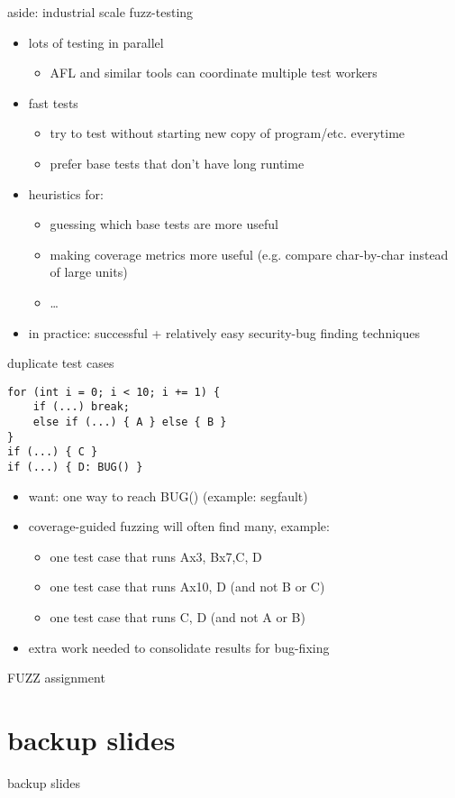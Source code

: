 \begin{frame}{aside: industrial scale fuzz-testing}
    \begin{itemize}
    \item lots of testing in parallel
        \begin{itemize}
        \item AFL and similar tools can coordinate multiple test workers
        \end{itemize}
    \item fast tests
        \begin{itemize}
        \item try to test without starting new copy of program/etc. everytime
        \item prefer base tests that don't have long runtime
        \end{itemize}
    \item heuristics for:   
        \begin{itemize}
        \item guessing which base tests are more useful
        \item making coverage metrics more useful (e.g. compare char-by-char instead of large units)
        \item \ldots
        \end{itemize}
    \item in practice: successful + relatively easy security-bug finding techniques
    \end{itemize}
\end{frame}

\begin{frame}[fragile]{duplicate test cases}
\begin{Verbatim}[fontsize=\small]
for (int i = 0; i < 10; i += 1) {
    if (...) break;
    else if (...) { A } else { B }
}
if (...) { C }
if (...) { D: BUG() }
\end{Verbatim}
\begin{itemize}
\item want: one way to reach BUG() (example: segfault)
\item coverage-guided fuzzing will often find many, example:
    \begin{itemize}
    \item one test case that runs Ax3, Bx7,C, D
    \item one test case that runs Ax10, D (and not B or C)
    \item one test case that runs C, D (and not A or B)
    \end{itemize}
\item extra work needed to consolidate results for bug-fixing
\end{itemize}
\end{frame}

\begin{frame}{FUZZ assignment}
\end{frame}







\section{backup slides}
\begin{frame}{backup slides}
\end{frame}


